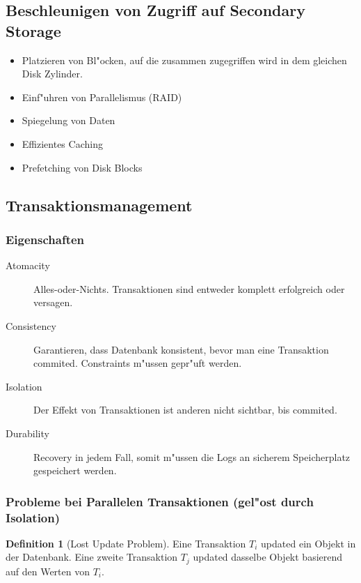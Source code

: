 \documentclass[german, 10pt, a4paper, twocolumn]{scrartcl}
\theoremstyle{definition}
\newtheorem{definition}{Definition}
\theoremstyle{remark}
\theoremstyle{example}
\begin{document}
\subsection{Beschleunigen von Zugriff auf Secondary Storage}

\begin{itemize}
	\item Platzieren von Bl"ocken, auf die zusammen zugegriffen wird in dem gleichen Disk Zylinder.
	\item Einf"uhren von Parallelismus (RAID)
	\item Spiegelung von Daten
	\item Effizientes Caching
	\item Prefetching von Disk Blocks
\end{itemize}

\subsection{Transaktionsmanagement}

\subsubsection{Eigenschaften}

\begin{description}
	\item[Atomacity] Alles-oder-Nichts. Transaktionen sind entweder komplett erfolgreich oder versagen.
	\item[Consistency] Garantieren, dass Datenbank konsistent, bevor man eine Transaktion commited. Constraints m"ussen gepr"uft werden.
	\item[Isolation] Der Effekt von Transaktionen ist anderen nicht sichtbar, bis commited.
	\item[Durability] Recovery in jedem Fall, somit m"ussen die Logs an sicherem Speicherplatz gespeichert werden.
\end{description}

\subsubsection{Probleme bei Parallelen Transaktionen (gel"ost durch Isolation)}

\begin{definition}[Lost Update Problem]
	Eine Transaktion $T_i$ updated ein Objekt in der Datenbank. Eine zweite Transaktion $T_j$ updated dasselbe Objekt basierend auf den Werten von $T_i$.
\end{definition}
\end{document}
